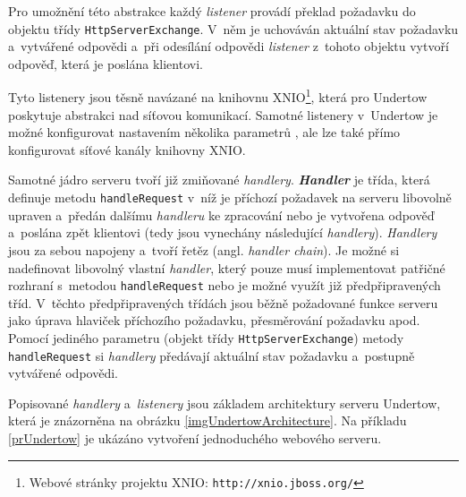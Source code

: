                 Pro umožnění této abstrakce každý \emph{listener} provádí překlad 
                požadavku do objektu třídy
                \texttt{HttpServerExchange}. V~něm je uchováván aktuální stav požadavku a~vytvářené odpovědi
                a~při odesílání odpovědi \emph{listener} z~tohoto objektu vytvoří odpověď, která je poslána klientovi.

                Tyto listenery jsou těsně navázané na knihovnu XNIO\footnote{Webové stránky projektu XNIO: \texttt{http://xnio.jboss.org/}}, která
                pro Undertow poskytuje abstrakci nad síťovou komunikací. Samotné listenery v~Undertow je možné konfigurovat
                nastavením několika parametrů \cite{undertowListeners}, ale lze také přímo konfigurovat síťové kanály knihovny XNIO.

                \medskip
                Samotné jádro serveru tvoří již zmiňované \emph{handlery}.
                \textbf{\emph{Handler}} je třída, která definuje metodu \texttt{handleRequest} v~níž
                je příchozí požadavek na serveru libovolně upraven a~předán dalšímu \emph{handleru} ke zpracování nebo je vytvořena odpověď 
                a~poslána zpět klientovi (tedy jsou vynechány následující \emph{handlery}). 
                \emph{Handlery} jsou za sebou napojeny a~tvoří řetěz (angl. \emph{handler chain}).
                Je možné si nadefinovat libovolný vlastní \emph{handler}, který pouze musí implementovat patřičné rozhraní s~metodou 
                \texttt{handleRequest} nebo je možné využít již předpřipravených tříd. V~těchto předpřipravených třídách
                jsou běžně požadované funkce serveru jako úprava hlaviček příchozího požadavku, přesměrování požadavku apod.
                Pomocí jediného parametru (objekt třídy \texttt{HttpServerExchange}) metody \texttt{handleRequest} 
                si \emph{handlery} předávají aktuální stav požadavku a~postupně vytvářené odpovědi.


                Popisované \emph{handlery} a~\emph{listenery} jsou základem architektury serveru Undertow, která je znázorněna
                na obrázku \ref{imgUndertowArchitecture}. 
                Na příkladu \ref{prUndertow} je ukázáno vytvoření jednoduchého webového serveru.

